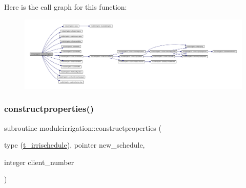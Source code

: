 Here is the call graph for this function\+:\nopagebreak
\begin{figure}[H]
\begin{center}
\leavevmode
\includegraphics[width=350pt]{namespacemoduleirrigation_a1533651367025ce2df52f548e83ecf32_cgraph}
\end{center}
\end{figure}
\mbox{\label{namespacemoduleirrigation_a3c38f9eb6c59407d288913caba5f6569}} 
\subsubsection{\texorpdfstring{constructproperties()}{constructproperties()}}
{\footnotesize\ttfamily subroutine moduleirrigation\+::constructproperties (\begin{DoxyParamCaption}\item[{type (\mbox{\hyperlink{structmoduleirrigation_1_1t__irrischedule}{t\+\_\+irrischedule}}), pointer}]{new\+\_\+schedule,  }\item[{integer}]{client\+\_\+number }\end{DoxyParamCaption})\hspace{0.3cm}{\ttfamily [private]}}

